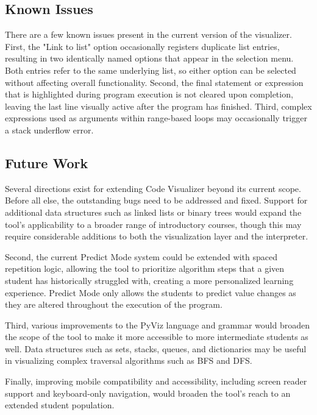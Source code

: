 \documentclass{IEEEtran}
\begin{document}
\subsection{Known Issues}
There are a few known issues present in the current version of the visualizer. First, the "Link to list" option occasionally registers duplicate list entries, resulting in two identically named options that appear in the selection menu. Both entries refer to the same underlying list, so either option can be selected without affecting overall functionality. Second, the final statement or expression that is highlighted during program execution is not cleared upon completion, leaving the last line visually active after the program has finished. Third, complex expressions used as arguments within range-based loops may occasionally trigger a stack underflow error.

\subsection{Future Work}
Several directions exist for extending Code Visualizer beyond its current scope. Before all else, the outstanding bugs need to be addressed and fixed. Support for additional data structures such as linked lists or binary trees would expand the tool's applicability to a broader range of introductory courses, though this may require considerable additions to both the visualization layer and the interpreter.

Second, the current Predict Mode system could be extended with spaced repetition logic, allowing the tool to prioritize algorithm steps that a given student has historically struggled with, creating a more personalized learning experience. Predict Mode only allows the students to predict value changes as they are altered throughout the execution of the program.

Third, various improvements to the PyViz language and grammar would broaden the scope of the tool to make it more accessible to more intermediate students as well. Data structures such as sets, stacks, queues, and dictionaries may be useful in visualizing complex traversal algorithms such as BFS and DFS.

Finally, improving mobile compatibility and accessibility, including screen reader support and keyboard-only navigation, would broaden the tool's reach to an extended student population.
\end{document}

